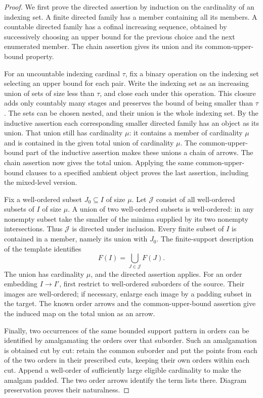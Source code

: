 \begin{proof}
We first prove the directed assertion by induction on the cardinality
of an indexing set.  A finite directed family has a member containing
all its members.  A countable directed family has a cofinal increasing
sequence, obtained by successively choosing an upper bound for the
previous choice and the next enumerated member.  The chain assertion
gives its union and its common-upper-bound property.

For an uncountable indexing cardinal $\tau$, fix a binary operation on
the indexing set selecting an upper bound for each pair.  Write the
indexing set as an increasing union of sets of size less than $\tau$,
and close each under this operation.  This closure adds only countably
many stages and preserves the bound of being smaller than $\tau$.
The sets can be chosen nested, and their union is the whole indexing
set.  By the inductive assertion each corresponding smaller directed
family has an object as its union.  That union still has cardinality
$\mu$: it contains a member of cardinality $\mu$ and is contained in
the given total union of cardinality $\mu$.  The common-upper-bound
part of the inductive assertion makes these unions a chain of arrows.
The chain assertion now gives the total union.  Applying the same
common-upper-bound clauses to a specified ambient object proves the
last assertion, including the mixed-level version.

Fix a well-ordered subset $J_0\subseteq I$ of size $\mu$.  Let
$\mathcal J$ consist of all well-ordered subsets of $I$ of size $\mu$.
A union of two well-ordered subsets is well-ordered: in any nonempty
subset take the smaller of the minima supplied by its two nonempty
intersections.  Thus $\mathcal J$ is directed under inclusion.  Every
finite subset of $I$ is contained in a member, namely its union with
$J_0$.  The finite-support description of the template identifies
\[
                  F(I)=\bigcup_{J\in\mathcal J}F(J).
\]
The union has cardinality $\mu$, and the directed assertion applies.
For an order embedding $I\to I'$, first restrict to well-ordered
suborders of the source.  Their images are well-ordered; if necessary,
enlarge each image by a padding subset in the target.  The known order
arrows and the common-upper-bound assertion give the induced map on
the total union as an arrow.

Finally, two occurrences of the same bounded support pattern in
orders can be identified by amalgamating the orders over that
suborder.  Such an amalgamation is obtained cut by cut: retain the
common suborder and put the points from each of the two orders in
their prescribed cuts, keeping their own orders within each cut.
Append a well-order of sufficiently large eligible cardinality to
make the amalgam padded.  The two order arrows identify the term
lists there.  Diagram preservation proves their naturalness.
\end{proof}

